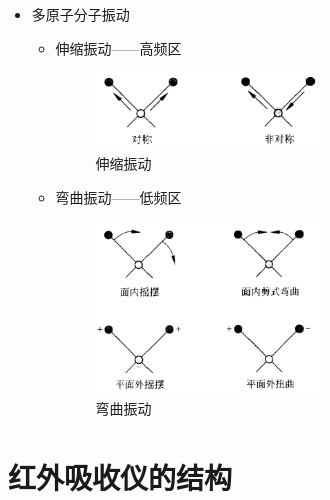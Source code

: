 \begin{itemize}
\begin{theorem*}{谐振子模型}
		其中各符号意义：
		\begin{itemize}
			\item $c$：光速
			\item $k$：键力常数
			\item $\mu$：折合质量$\mu=\frac{m_{1}\cdot m_{2}}{m_{1}+m_{2}}$
		\end{itemize}
	\end{theorem*}
	\item 多原子分子振动
	\begin{itemize}
		\item 伸缩振动——高频区
		\begin{figure}[ht]
			\centering
			\includegraphics[width=6cm]{image/chp5_flex_vir.png}
			\caption{伸缩振动}
			\label{fig:flex}
		\end{figure}
		\item 弯曲振动——低频区
		\begin{figure}[ht]
			\centering
			\includegraphics[width=6cm]{image/chp5_twi_vir.png}
			\caption{弯曲振动}
			\label{fig:twist}
		\end{figure}
	\end{itemize}

\end{itemize}

\section{红外吸收仪的结构}
